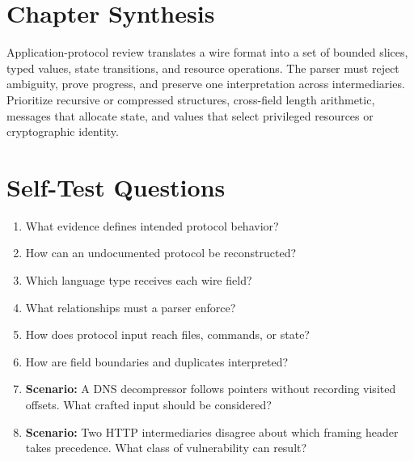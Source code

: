 \documentclass[11pt,letterpaper]{article}
\begin{document}
\section{Chapter Synthesis}
Application-protocol review translates a wire format into a set of bounded slices, typed values, state transitions, and resource operations. The parser must reject ambiguity, prove progress, and preserve one interpretation across intermediaries. Prioritize recursive or compressed structures, cross-field length arithmetic, messages that allocate state, and values that select privileged resources or cryptographic identity.
\section{Self-Test Questions}
\begin{enumerate}
\item What evidence defines intended protocol behavior?
\item How can an undocumented protocol be reconstructed?
\item Which language type receives each wire field?
\item What relationships must a parser enforce?
\item How does protocol input reach files, commands, or state?
\item How are field boundaries and duplicates interpreted?
\item \textbf{Scenario:} A DNS decompressor follows pointers without recording visited offsets. What crafted input should be considered?
\item \textbf{Scenario:} Two HTTP intermediaries disagree about which framing header takes precedence. What class of vulnerability can result?
\end{enumerate}
\clearpage
\end{document}
